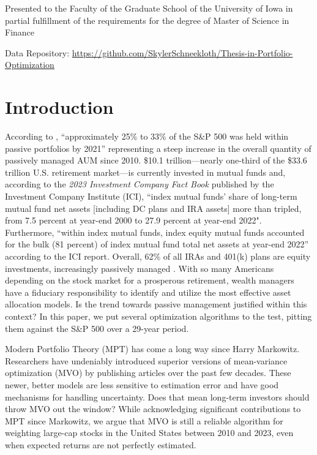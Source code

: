 \documentclass[12pt,letterpaper]{article}
\begin{document}
{\Centering
Presented to the Faculty of the Graduate School of the University of Iowa in partial fulfillment of the requirements for the degree of Master of Science in Finance \par}

\vspace{0.5cm}

{\Centering
Data Repository: \href{https://github.com/SkylerSchneekloth/Thesis-in-Portfolio-Optimization}{https://github.com/SkylerSchneekloth/Thesis-in-Portfolio-Optimization}}

\newpage

\section{Introduction}

According to , “approximately 25\% to 33\% of the S\&P 500 was held within passive portfolios by 2021” representing a steep increase in the overall quantity of passively managed AUM since 2010. \$10.1 trillion---nearly one-third of the \$33.6 trillion U.S. retirement market---is currently invested in mutual funds and, according to the \textit{2023 Investment Company Fact Book} published by the Investment Company Institute (ICI), “index mutual funds’ share of long-term mutual fund net assets [including DC plans and IRA assets] more than tripled, from 7.5 percent at year-end 2000 to 27.9 percent at year-end 2022". Furthermore, “within index mutual funds, index equity mutual funds accounted for the bulk (81 percent) of index mutual fund total net assets at year-end 2022” according to the ICI report. Overall, 62\% of all IRAs and 401(k) plans are equity investments, increasingly passively managed \cite{ICI2023Factbook}. With so many Americans depending on the stock market for a prosperous retirement, wealth managers have a fiduciary responsibility to identify and utilize the most effective asset allocation models. Is the trend towards passive management justified within this context? In this paper, we put several optimization algorithms to the test, pitting them against the S\&P 500 over a 29-year period.

Modern Portfolio Theory (MPT) has come a long way since Harry Markowitz. Researchers have undeniably introduced superior versions of mean-variance optimization (MVO) by publishing articles over the past few decades. These newer, better models are less sensitive to estimation error and have good mechanisms for handling uncertainty. Does that mean long-term investors should throw MVO out the window? While acknowledging significant contributions to MPT since Markowitz, we argue that MVO is still a reliable algorithm for weighting large-cap stocks in the United States between 2010 and 2023, even when expected returns are not perfectly estimated.
\end{document}
